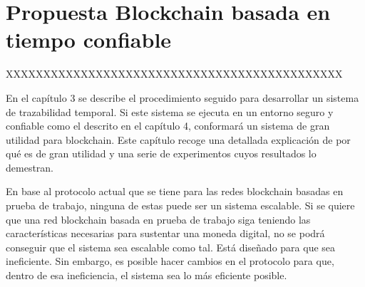 \chapter{Propuesta Blockchain basada en tiempo confiable}

XXXXXXXXXXXXXXXXXXXXXXXXXXXXXXXXXXXXXXXXXXXXX\newline

En el capítulo 3 se describe el procedimiento seguido para desarrollar un sistema de trazabilidad temporal. Si este sistema se ejecuta en un entorno seguro y confiable como el descrito en el capítulo 4, conformará un sistema de gran utilidad para blockchain. Este capítulo recoge una detallada explicación de por qué es de gran utilidad y una serie de experimentos cuyos resultados lo demestran. \newline

En base al protocolo actual que se tiene para las redes blockchain basadas en prueba de trabajo, ninguna de estas puede ser un sistema escalable. Si se quiere que una red blockchain basada en prueba de trabajo siga teniendo las características necesarias para sustentar una moneda digital, no se podrá conseguir que el sistema sea escalable como tal. Está diseñado para que sea ineficiente. Sin embargo, es posible hacer cambios en el protocolo para que, dentro de esa ineficiencia, el sistema sea lo más eficiente posible. \newline

